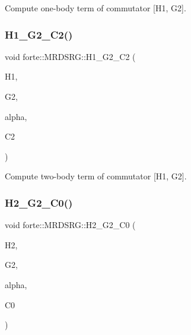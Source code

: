Compute one-\/body term of commutator \mbox{[}H1, G2\mbox{]}. 

\mbox{\label{classforte_1_1_m_r_d_s_r_g_a5d2d27cb45e6395e638864835e30667f}} 
\subsubsection{\texorpdfstring{H1\+\_\+\+G2\+\_\+\+C2()}{H1\_G2\_C2()}}
{\footnotesize\ttfamily void forte\+::\+M\+R\+D\+S\+R\+G\+::\+H1\+\_\+\+G2\+\_\+\+C2 (\begin{DoxyParamCaption}\item[{Blocked\+Tensor \&}]{H1,  }\item[{Blocked\+Tensor \&}]{G2,  }\item[{const double \&}]{alpha,  }\item[{Blocked\+Tensor \&}]{C2 }\end{DoxyParamCaption})\hspace{0.3cm}{\ttfamily [protected]}}



Compute two-\/body term of commutator \mbox{[}H1, G2\mbox{]}. 

\mbox{\label{classforte_1_1_m_r_d_s_r_g_a1de2c9448d9e7f477e2713549c1b9d2e}} 
\subsubsection{\texorpdfstring{H2\+\_\+\+G2\+\_\+\+C0()}{H2\_G2\_C0()}}
{\footnotesize\ttfamily void forte\+::\+M\+R\+D\+S\+R\+G\+::\+H2\+\_\+\+G2\+\_\+\+C0 (\begin{DoxyParamCaption}\item[{Blocked\+Tensor \&}]{H2,  }\item[{Blocked\+Tensor \&}]{G2,  }\item[{const double \&}]{alpha,  }\item[{double \&}]{C0 }\end{DoxyParamCaption})\hspace{0.3cm}{\ttfamily [protected]}}



